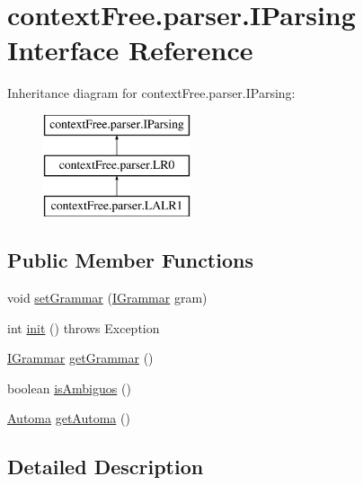 \hypertarget{interfacecontext_free_1_1parser_1_1_i_parsing}{\section{context\-Free.\-parser.\-I\-Parsing Interface Reference}
\label{interfacecontext_free_1_1parser_1_1_i_parsing}
}
Inheritance diagram for context\-Free.\-parser.\-I\-Parsing\-:\begin{figure}[H]
\begin{center}
\leavevmode
\includegraphics[height=3.000000cm]{interfacecontext_free_1_1parser_1_1_i_parsing}
\end{center}
\end{figure}
\subsection*{Public Member Functions}
\begin{DoxyCompactItemize}
\item 
void \hyperlink{interfacecontext_free_1_1parser_1_1_i_parsing_aef8f0a7918cfdcf3f67640bfe38b1e5f}{set\-Grammar} (\hyperlink{interfacecontext_free_1_1grammar_1_1_i_grammar}{I\-Grammar} gram)
\item 
int \hyperlink{interfacecontext_free_1_1parser_1_1_i_parsing_a310938e6db40c48c00d5e6f46712ee57}{init} ()  throws Exception
\item 
\hyperlink{interfacecontext_free_1_1grammar_1_1_i_grammar}{I\-Grammar} \hyperlink{interfacecontext_free_1_1parser_1_1_i_parsing_a518dbeee837638ba09a46f90f217e3b8}{get\-Grammar} ()
\item 
boolean \hyperlink{interfacecontext_free_1_1parser_1_1_i_parsing_a5022486813afab750b187046e06191a0}{is\-Ambiguos} ()
\item 
\hyperlink{classcontext_free_1_1parser_1_1_automa}{Automa} \hyperlink{interfacecontext_free_1_1parser_1_1_i_parsing_ae7681a63983b2b4eb37c207cc53deddf}{get\-Automa} ()
\end{DoxyCompactItemize}


\subsection{Detailed Description}


